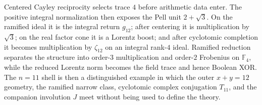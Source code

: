 \documentclass[11pt]{article}
\theoremstyle{remark}
\newcommand{\F}{\mathbb F}
\begin{document}
Centered Cayley reciprocity selects trace $4$ before arithmetic data enter.
The positive integral normalization then exposes the Pell unit $2+\sqrt3$.
On the ramified ideal it is the integral return $g_{12}$; after centering it
is multiplication by $\sqrt3$; on the real factor cone it is a Lorentz boost;
and after cyclotomic completion it becomes multiplication by $\zeta_{12}$ on
an integral rank-$4$ ideal.  Ramified reduction separates the structure into
order-$3$ multiplication and order-$2$ Frobenius on $\F_4$, while the reduced
Lorentz norm becomes the field trace and hence Boolean XOR.  The $n=11$
shell is then a distinguished example in which the outer $x+y=12$ geometry,
the ramified narrow class, cyclotomic complex conjugation $T_{11}$, and the
companion involution $J$ meet without being used to define the theory.
\end{document}
